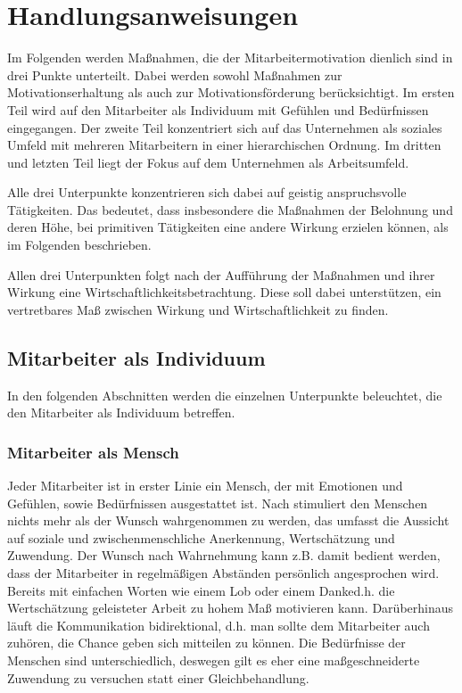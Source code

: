 \newpage
\section{Handlungsanweisungen}
Im Folgenden werden Maßnahmen, die der Mitarbeitermotivation dienlich sind in drei Punkte unterteilt. Dabei werden sowohl Maßnahmen zur Motivationserhaltung als auch zur Motivationsförderung berücksichtigt. 
Im ersten Teil wird auf den Mitarbeiter als Individuum mit Gefühlen und Bedürfnissen eingegangen. Der zweite Teil konzentriert sich auf das Unternehmen als soziales Umfeld mit mehreren Mitarbeitern in einer hierarchischen Ordnung. Im dritten und letzten Teil liegt der Fokus auf dem Unternehmen als Arbeitsumfeld.

Alle drei Unterpunkte konzentrieren sich dabei auf geistig anspruchsvolle Tätigkeiten. Das bedeutet, dass insbesondere die Maßnahmen der Belohnung und deren Höhe, bei primitiven Tätigkeiten eine andere Wirkung erzielen können, als im Folgenden beschrieben. 

Allen drei Unterpunkten folgt nach der Aufführung der Maßnahmen und ihrer Wirkung eine Wirtschaftlichkeitsbetrachtung. Diese soll dabei unterstützen, ein vertretbares Maß zwischen Wirkung und Wirtschaftlichkeit zu finden. 

\subsection{Mitarbeiter als Individuum}
In den folgenden Abschnitten werden die einzelnen Unterpunkte beleuchtet, die den Mitarbeiter als Individuum betreffen.

\subsubsection{Mitarbeiter als Mensch}
Jeder Mitarbeiter ist in erster Linie ein Mensch, der mit Emotionen und Gefühlen, sowie Bedürfnissen ausgestattet ist. Nach \citet[S. 18]{Seelbach.2011}  stimuliert den Menschen nichts mehr als der Wunsch wahrgenommen zu werden, das umfasst die Aussicht auf soziale und zwischenmenschliche Anerkennung, Wertschätzung und Zuwendung. 
Der Wunsch nach Wahrnehmung kann z.B. damit bedient werden, dass der Mitarbeiter in regelmäßigen Abständen persönlich angesprochen wird. Bereits mit einfachen Worten wie einem Lob oder einem \glqq Danke\grqq d.h. die Wertschätzung geleisteter Arbeit zu hohem Maß motivieren kann. Darüberhinaus läuft die Kommunikation bidirektional, d.h. man sollte dem Mitarbeiter auch zuhören, die Chance geben sich mitteilen zu können. 
Die Bedürfnisse der Menschen sind unterschiedlich, deswegen gilt es eher eine maßgeschneiderte Zuwendung zu versuchen statt einer Gleichbehandlung. 

